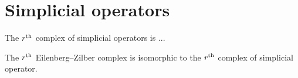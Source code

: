 
\section{Simplicial operators}


\begin{definition}
	The $r^\mathrm{th}$ complex of simplicial operators is ...
\end{definition}

\begin{theorem}
	The $r^\mathrm{th}$ Eilenberg--Zilber complex is isomorphic to the $r^\mathrm{th}$ complex of simplicial operator.
\end{theorem}